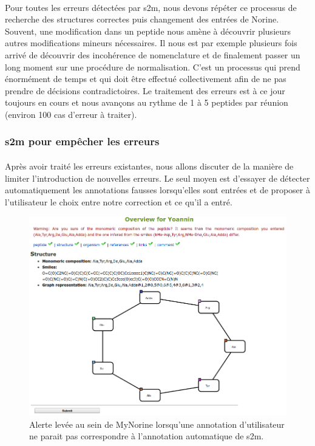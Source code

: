 \documentclass[12pt,french,twoside]{report}
\begin{document}
\paragraph{}Pour toutes les erreurs détectées par s2m, nous devons répéter ce processus de recherche des structures correctes puis changement des entrées de Norine.
Souvent, une modification dans un peptide nous amène à découvrir plusieurs autres modifications mineurs nécessaires.
Il nous est par exemple plusieurs fois arrivé de découvrir des incohérence de nomenclature et de finalement passer un long moment sur une procédure de normalisation.
C'est un processus qui prend énormément de temps et qui doit être effectué collectivement afin de ne pas prendre de décisions contradictoires.
Le traitement des erreurs est à ce jour toujours en cours et nous avançons au rythme de 1 à 5 peptides par réunion (environ 100 cas d'erreur à traiter).


\subsubsection{s2m pour empêcher les erreurs}

\paragraph{}Après avoir traité les erreurs existantes, nous allons discuter de la manière de limiter l'introduction de nouvelles erreurs.
Le seul moyen est d'essayer de détecter automatiquement les annotations fausses lorsqu'elles sont entrées et de proposer à l'utilisateur le choix entre notre correction et ce qu'il a entré.

\begin{figure}[h!]
  \begin{center}
    \includegraphics[width=450px]{Figures/contributions/warning.png}
    \caption{\label{warning}Alerte levée au sein de MyNorine lorsqu'une annotation d'utilisateur ne parait pas correspondre à l'annotation automatique de s2m.}
  \end{center}
\end{figure}
\end{document}
